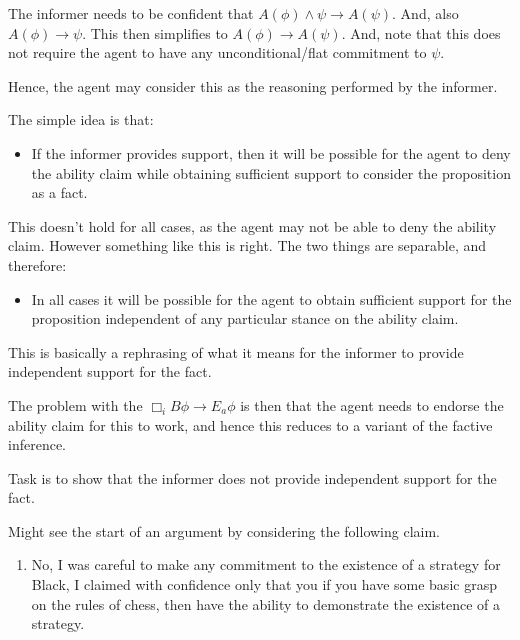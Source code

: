 \documentclass[10pt]{article}
\newcommand{\hozlinedash}[0]{%
  \noindent\hdashrule[0.5ex][c]{\textwidth}{.1pt}{2.5pt}
}
\begin{document}
\begin{note}
  The informer needs to be confident that \(A(\phi) \land \psi \rightarrow A(\psi)\).
  And, also \(A(\phi) \rightarrow \psi\).
  This then simplifies to \(A(\phi) \rightarrow A(\psi)\).
  And, note that this does not require the agent to have any unconditional/flat commitment to \(\psi\).

  Hence, the agent may consider this as the reasoning performed by the informer.
\end{note}

\hozlinedash

\begin{note}
  The simple idea is that:
  \begin{itemize}
  \item If the informer provides support, then it will be possible for the agent to deny the ability claim while obtaining sufficient support to consider the proposition as a fact.
  \end{itemize}
  This doesn't hold for all cases, as the agent may not be able to deny the ability claim.
  However something like this is right.
  The two things are separable, and therefore:
  \begin{itemize}
  \item In all cases it will be possible for the agent to obtain sufficient support for the proposition independent of any particular stance on the ability claim.
  \end{itemize}
  This is basically a rephrasing of what it means for the informer to provide independent support for the fact.

  The problem with the \(\Box_{i} B \phi \rightarrow E_{a}\phi\) is then that the agent needs to endorse the ability claim for this to work, and hence this reduces to a variant of the factive inference.
\end{note}

Task is to show that the informer does not provide independent support for the fact.

Might see the start of an argument by considering the following claim.

\begin{enumerate}
\item\label{i:claim:exist} No, I was careful to make any commitment to the existence of a strategy for Black, I claimed with confidence only that you if you have some basic grasp on the rules of chess, then have the ability to demonstrate the existence of a strategy.
\end{enumerate}
\end{document}
